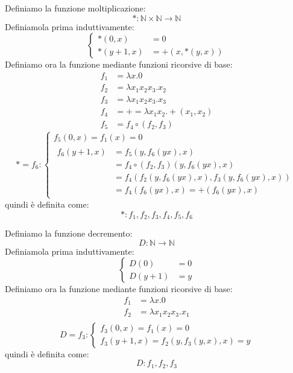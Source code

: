 \documentclass[a4paper]{article}
\begin{document}
\begin{example}[Moltiplicazione]
  Definiamo la funzione moltiplicazione:
  \[
    *: \mathbb{N} \times \mathbb{N} \to \mathbb{N}
  \] 
  Definiamola prima induttivamente:
  \[
    \begin{cases}
      *(0, x) &= 0 \\
      *(y+1, x) &= +(x, *(y, x))
    \end{cases}
  \] 
  Definiamo ora la funzione mediante funzioni ricorsive di base:
  \[
    \begin{aligned}
      f_1 &= \lambda x. 0 \\
      f_2 &= \lambda x_1 x_2 x_3. x_2 \\
      f_3 &= \lambda x_1 x_2 x_3. x_3 \\
      f_4 &= + = \lambda x_1 x_2. +(x_1, x_2) \\
      f_5 &= f_4 \circ (f_2, f_3)
    \end{aligned}
  \] 
  \[
    * = f_6:
    \begin{cases}
      f_5(0,x) = f_1(x) = 0 \\
      \begin{aligned}
        f_6(y+1, x) &= f_5(y, f_6(y x), x) \\
                   &= f_4 \circ (f_2, f_3) (y, f_6(y x), x) \\
                   &= f_4(f_2(y, f_6(y x), x), f_3(y, f_6(y x), x)) \\
                   &= f_4(f_6(y x), x) = +(f_6(y x), x)
      \end{aligned}
    \end{cases}
  \] 
  quindi è definita come:
  \[
    *: f_1, f_2, f_3, f_4, f_5, f_6
  \] 
\end{example}

\begin{example}[Decremento]
  Definiamo la funzione decremento:
  \[
    D: \mathbb{N} \to \mathbb{N}
  \] 
  Definiamola prima induttivamente:
  \[
    \begin{cases}
      D(0) &= 0 \\
      D(y+1) &= y
    \end{cases}
  \] 
  Definiamo ora la funzione mediante funzioni ricorsive di base:
  \[
    \begin{aligned}
      f_1 &= \lambda x. 0 \\
      f_2 &= \lambda x_1 x_2 x_3. x_1 \\
    \end{aligned}
  \] 
  \[
    D = f_3:
    \begin{cases}
      f_3(0, x) = f_1(x) = 0 \\
      f_3(y+1, x) = f_2(y, f_3(y, x), x) = y
    \end{cases}
  \] 
  quindi è definita come:
  \[
    D: f_1, f_2, f_3
  \]
\end{example}
\end{document}
